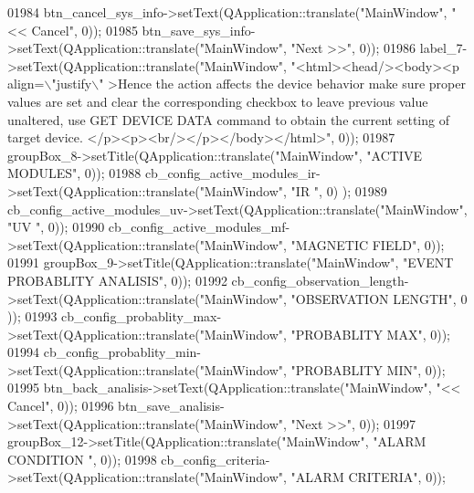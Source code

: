 \begin{DoxyCode}
01984         btn\_cancel\_sys\_info->setText(QApplication::translate(\textcolor{stringliteral}{"MainWindow"}, \textcolor{stringliteral}{"<< Cancel"}, 0));
01985         btn\_save\_sys\_info->setText(QApplication::translate(\textcolor{stringliteral}{"MainWindow"}, \textcolor{stringliteral}{"Next >>"}, 0));
01986         label\_7->setText(QApplication::translate(\textcolor{stringliteral}{"MainWindow"}, \textcolor{stringliteral}{"<html><head/><body><p align=\(\backslash\)"justify\(\backslash\)"
      >Hence the action affects the device behavior make sure proper values are set and clear the corresponding
       checkbox to leave previous value unaltered, use GET DEVICE DATA command to obtain the current setting of target
       device. </p><p><br/></p></body></html>"}, 0));
01987         groupBox\_8->setTitle(QApplication::translate(\textcolor{stringliteral}{"MainWindow"}, \textcolor{stringliteral}{"ACTIVE MODULES"}, 0));
01988         cb\_config\_active\_modules\_ir->setText(QApplication::translate(\textcolor{stringliteral}{"MainWindow"}, \textcolor{stringliteral}{"IR                "}, 0)
      );
01989         cb\_config\_active\_modules\_uv->setText(QApplication::translate(\textcolor{stringliteral}{"MainWindow"}, \textcolor{stringliteral}{"UV            "}, 0));
01990         cb\_config\_active\_modules\_mf->setText(QApplication::translate(\textcolor{stringliteral}{"MainWindow"}, \textcolor{stringliteral}{"MAGNETIC FIELD"}, 0));
01991         groupBox\_9->setTitle(QApplication::translate(\textcolor{stringliteral}{"MainWindow"}, \textcolor{stringliteral}{"EVENT PROBABLITY ANALISIS"}, 0));
01992         cb\_config\_observation\_length->setText(QApplication::translate(\textcolor{stringliteral}{"MainWindow"}, \textcolor{stringliteral}{"OBSERVATION LENGTH"}, 0
      ));
01993         cb\_config\_probablity\_max->setText(QApplication::translate(\textcolor{stringliteral}{"MainWindow"}, \textcolor{stringliteral}{"PROBABLITY MAX"}, 0));
01994         cb\_config\_probablity\_min->setText(QApplication::translate(\textcolor{stringliteral}{"MainWindow"}, \textcolor{stringliteral}{"PROBABLITY MIN"}, 0));
01995         btn\_back\_analisis->setText(QApplication::translate(\textcolor{stringliteral}{"MainWindow"}, \textcolor{stringliteral}{"<< Cancel"}, 0));
01996         btn\_save\_analisis->setText(QApplication::translate(\textcolor{stringliteral}{"MainWindow"}, \textcolor{stringliteral}{"Next >>"}, 0));
01997         groupBox\_12->setTitle(QApplication::translate(\textcolor{stringliteral}{"MainWindow"}, \textcolor{stringliteral}{"ALARM CONDITION "}, 0));
01998         cb\_config\_criteria->setText(QApplication::translate(\textcolor{stringliteral}{"MainWindow"}, \textcolor{stringliteral}{"ALARM CRITERIA"}, 0));

\end{DoxyCode}

